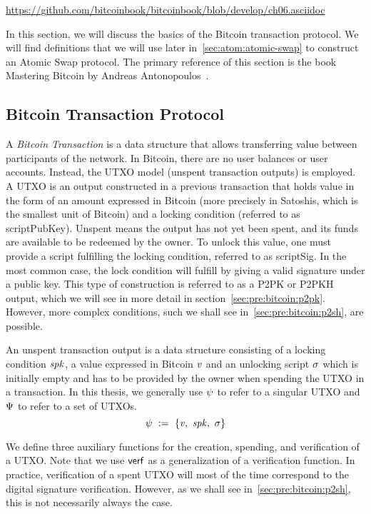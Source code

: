 \urldef\urlbtcbook\url{https://github.com/bitcoinbook/bitcoinbook/blob/develop/ch06.asciidoc}

In this section, we will discuss the basics of the Bitcoin transaction protocol.
We will find definitions that we will use later in~\cref{sec:atom:atomic-swap} to construct an Atomic Swap protocol.
The primary reference of this section is the book Mastering Bitcoin by Andreas Antonopoulos~\cite{antonopoulos2014mastering}.

\subsection{Bitcoin Transaction Protocol}\label{subsec:pre:bitcointx}

A \emph{Bitcoin Transaction} is a data structure that allows transferring value between participants of the network.
In Bitcoin, there are no user balances or user accounts.
Instead, the UTXO model (unspent transaction outputs) is employed.
A UTXO is an output constructed in a previous transaction that holds value in the form of an amount expressed in
Bitcoin (more precisely in Satoshis, which is the smallest unit of Bitcoin) and a locking condition (referred to as
scriptPubKey).
Unspent means the output has not yet been spent, and its funds are available to be redeemed by the owner.
To unlock this value, one must provide a script fulfilling the locking condition, referred to as scriptSig.
In the most common case, the lock condition will fulfill by giving a valid signature under a public key.
This type of construction is referred to as a P2PK or P2PKH output, which we will see in more detail in section~\cref{sec:pre:bitcoin:p2pk}.
However, more complex conditions, such we shall see in~\cref{sec:pre:bitcoin:p2sh}, are possible.

\begin{definition} An unspent transaction output is a data structure consisting of a locking condition $\mathit{spk}$, a value expressed in Bitcoin $\mathit{v}$ and an unlocking script $\mathit{\sigma}$ which is initially empty and has to be provided by the owner when spending the UTXO in a transaction.
In this thesis, we generally use $\psi$ to refer to a singular UTXO and $\Psi$ to refer to a set of UTXOs.
    \[ \psi ~:=~ \{ \mathit{v} ,~ \mathit{spk} ,~ \mathit{\sigma} \} \]
\end{definition}

We define three auxiliary functions for the creation, spending, and verification of a UTXO.
Note that we use $\mathsf{verf}$ as a generalization of a verification function.
In practice, verification of a spent UTXO will most of the time correspond to the digital signature verification.
However, as we shall see in~\cref{sec:pre:bitcoin:p2sh}, this is not necessarily always the case.

